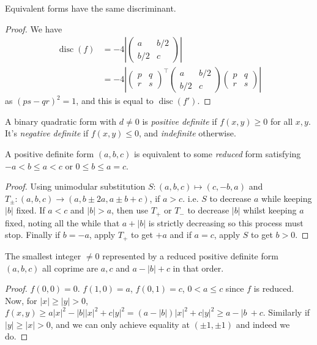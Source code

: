 \documentclass[a4paper, 10pt, twocolumn]{amsart}
\begin{document}
\begin{theorem}
    Equivalent forms have the same discriminant.
\end{theorem}
\begin{proof}
We have
\begin{align*}
    \operatorname{disc}(f) &= -4\left| \begin{pmatrix}
        a & b/2 \\ b/2 & c
    \end{pmatrix}\right|\\ &= -4 \left|\begin{pmatrix}
        p & q \\ r & s
    \end{pmatrix}^{\intercal} \begin{pmatrix}
        a & b/2 \\ b/2 & c
    \end{pmatrix} \begin{pmatrix}
        p & q \\ r & s
    \end{pmatrix}\right|
\end{align*}
as $(ps - qr)^2 = 1$, and this is equal to $\operatorname{disc}(f')$.
\end{proof}

\begin{definition}
    A binary quadratic form with $d \neq 0$ is \emph{positive definite} if $f(x, y) \geq 0$ for all $x, y$.
    It's \emph{negative definite} if $f(x, y) \leq 0$, and \emph{indefinite} otherwise. 
\end{definition}

\begin{theorem}
    A positive definite form $(a, b, c)$ is equivalent to some \emph{reduced} form satisfying $-a < b \leq a < c$ or $0 \leq b \leq a = c$.
\end{theorem}
\begin{proof}
    Using unimodular substitution $S: (a, b, c) \mapsto (c, -b, a)$ and $T_{\pm}: (a, b, c) \rightarrow (a, b \pm 2a, a \pm b + c)$, if $a > c$. i.e. $S$ to decrease $a$ while keeping $|b|$ fixed. If $a < c$ and $|b| > a$, then use $T_+$ or $T_-$ to decrease $|b|$ whilst keeping $a$ fixed, noting all the while that $a + |b|$ is strictly decreasing so this process must stop. Finally if $b = -a$, apply $T_+$ to get $+a$ and if $a = c$, apply $S$ to get $b > 0$.
\end{proof}

\begin{theorem}
    The smallest integer $\neq 0$ represented by a reduced positive definite form $(a, b, c)$ all coprime are $a, c$ and $a - |b| + c$ in that order.
\end{theorem}
\begin{proof}
    $f(0, 0) = 0$. $f(1, 0) = a$, $f(0, 1)= c$, $0 < a \leq c$ since $f$ is reduced. Now, for $|x| \geq |y| > 0$, $f(x, y) \geq a|x|^2 - |b||x|^2 + c|y|^2 = (a - |b|)|x|^2 + c|y|^2 \geq a - |b\ + c$. Similarly if $|y| \geq |x| > 0$, and we can only achieve equality at $(\pm 1, \pm 1)$ and indeed we do.
\end{proof}
\end{document}
